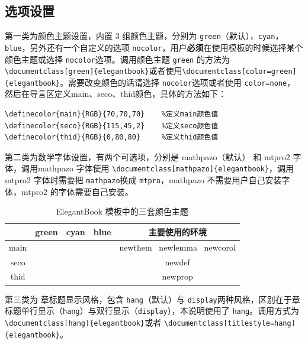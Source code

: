 \documentclass[color=green,mathpazo,titlestyle=hang,11pt]{elegantbook}
\begin{document}
\subsection{选项设置}
第一类为{\color{main}颜色}主题设置，内置 3 组颜色主题，分别为 \verb|green|（默认），\verb|cyan|，\verb|blue|，另外还有一个自定义的选项 \verb|nocolor|，用户\textbf{必须}在使用模板的时候选择某个颜色主题或选择 \verb|nocolor|选项。调用颜色主题 \verb|green| 的方法为\verb|\documentclass[green]{elegantbook}|或者使用\verb|\documentclass[color=green]{elegantbook}|。需要改变颜色的话请选择 \verb|nocolor|选项或者使用 \verb|color=none|，然后在导言区定义main、seco、thid颜色，具体的方法如下：
\begin{verbatim}
\definecolor{main}{RGB}{70,70,70}    %定义main颜色值
\definecolor{seco}{RGB}{115,45,2}    %定义seco颜色值
\definecolor{thid}{RGB}{0,80,80}     %定义thid颜色值
\end{verbatim}

第二类为{\color{main}数学字体}设置，有两个可选项，分别是 mathpazo（默认） 和 mtpro2 字体，调用mathpazo 字体使用 \verb|\documentclass[mathpazo]{elegantbook}|，调用 mtpro2 字体时需要把 \verb|mathpazo|换成 \verb|mtpro|，mathpazo 不需要用户自己安装字体，mtpro2 的字体需要自己安装。

\begin{table}[htp]
\centering
\begin{tabular}{ccccc}
\toprule
	  & green & cyan & blue & 主要使用的环境\\
\midrule
main & \makecell{{\color{main1}\rule{1cm}{1cm}}}& \makecell{{\color{main2}\rule{1cm}{1cm}}}&\makecell{ {\color{main3}\rule{1cm}{1cm}}}& newthem \ newlemma \ newcorol\\

seco &\makecell{ {\color{seco1}\rule{1cm}{1cm}}}& \makecell{{\color{seco2}\rule{1cm}{1cm}}}&\makecell{ {\color{seco3}\rule{1cm}{1cm}}}&newdef\\

thid &\makecell{ {\color{thid1}\rule{1cm}{1cm}}}& \makecell{{\color{thid2}\rule{1cm}{1cm}}}&\makecell{ {\color{thid3}\rule{1cm}{1cm}}}&newprop\\
\bottomrule
\end{tabular}
\caption{ElegantBook 模板中的三套颜色主题\label{tab:color thm}}
\end{table}

第三类为{\color{main} 章标题显示风格}，包含 \verb|hang|（默认）与 \verb|display|两种风格，区别在于章标题单行显示（\verb|hang|）与双行显示（\verb|display|），本说明使用了 \verb|hang|。调用方式为 \verb|\documentclass[hang]{elegantbook}|或者 \verb|\documentclass[titlestyle=hang]{elegantbook}|。
\end{document}
